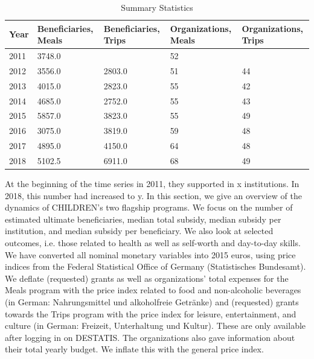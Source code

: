 \documentclass[12pt, a4paper]{article}\usepackage[]{graphicx}\usepackage[]{color}
\begin{document}
\begin{table}[ht]
\centering
\begin{tabular}{mmmmm}
  \hline
Year & Beneficiaries, Meals & Beneficiaries, Trips & Organizations, Meals & Organizations, Trips \\ 
  \hline
2011 & 3748.0 &  & 52 &  \\ 
  2012 & 3556.0 & 2803.0 & 51 & 44 \\ 
  2013 & 4015.0 & 2823.0 & 55 & 42 \\ 
  2014 & 4685.0 & 2752.0 & 55 & 43 \\ 
  2015 & 5857.0 & 3823.0 & 55 & 49 \\ 
  2016 & 3075.0 & 3819.0 & 59 & 48 \\ 
  2017 & 4895.0 & 4150.0 & 64 & 48 \\ 
  2018 & 5102.5 & 6911.0 & 68 & 49 \\ 
   \hline
\end{tabular}
\caption{Summary Statistics} 
\end{table}


At the beginning of the time series in 2011, they supported in x institutions. In 2018, this number had increased to y. In this section, we give an overview of the dynamics of CHILDREN's two flagship programs. We focus on the number of estimated ultimate beneficiaries, median total subsidy, median subsidy per institution, and median subsidy per beneficiary. We also look at selected outcomes, i.e. those related to health as well as self-worth and day-to-day skills. We have converted all nominal monetary variables into 2015 euros, using price indices from the Federal Statistical Office of Germany (Statistisches Bundesamt). We deflate (requested) grants as well as organizations' total expenses for the Meals program  with the price index related to food and non-alcoholic beverages (in German: Nahrungsmittel und alkoholfreie Getränke) and (requested) grants towards the Trips program with the price index for leisure, entertainment, and culture (in German: Freizeit, Unterhaltung und Kultur). These are only available after logging in on DESTATIS. The organizations also gave information about their total yearly budget. We inflate this with the general price index.    
\end{document}
